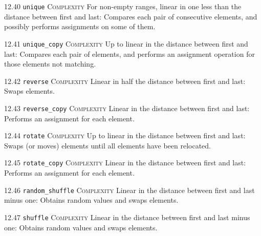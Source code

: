 \noindent\textcolor{corange}{12.40 \texttt{unique}} \textsc{Complexity} For non-empty ranges, linear in one less than the distance between first and last: Compares each pair of consecutive elements, and possibly performs assignments on some of them. \vspace{0.5em}

\noindent\textcolor{corange}{12.41 \texttt{unique\_copy}} \textsc{Complexity} Up to linear in the distance between first and last: Compares each pair of elements, and performs an assignment operation for those elements not matching. \vspace{0.5em}

\noindent\textcolor{corange}{12.42 \texttt{reverse}} \textsc{Complexity} Linear in half the distance between first and last: Swaps elements. \vspace{0.5em}

\noindent\textcolor{corange}{12.43 \texttt{reverse\_copy}} \textsc{Complexity} Linear in the distance between first and last: Performs an assignment for each element. \vspace{0.5em}

\noindent\textcolor{corange}{12.44 \texttt{rotate}} \textsc{Complexity} Up to linear in the distance between first and last: Swaps (or moves) elements until all elements have been relocated. \vspace{0.5em}

\noindent\textcolor{corange}{12.45 \texttt{rotate\_copy}} \textsc{Complexity} Linear in the distance between first and last: Performs an assignment for each element. \vspace{0.5em}

\noindent\textcolor{corange}{12.46 \texttt{random\_shuffle}} \textsc{Complexity} Linear in the distance between first and last minus one: Obtains random values and swaps elements. \vspace{0.5em}

\noindent\textcolor{corange}{12.47 \texttt{shuffle}} \textsc{Complexity} Linear in the distance between first and last minus one: Obtains random values and swaps elements. \vspace{0.5em}

